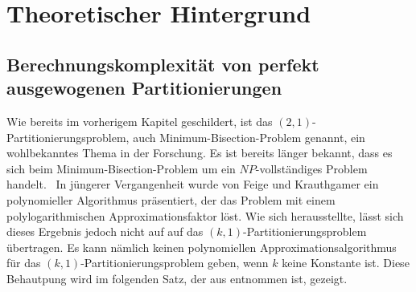 
\newcommand{\apxalg}{\mathcal{A}}
\newcommand{\oset}[2]{%
    \tikz[baseline=(X.base),inner sep=0pt,outer sep=0pt]{%
        \node[inner sep=0pt,outer sep=0pt] (X) {$#2$}; 
            \node[yshift=1pt] at (X.north) {$#1$};
    }
}
\newcommand{\calS}{\mathcal{S}}
\newcommand{\bbS}{\mathbb{S}}
\newcommand{\tildaS}{\oset{\ \scriptstyle\sim}{\calS}}
\newcommand{\calL}{\mathcal{L}}
\newcommand{\calV}{\mathcal{V}}

\chapter{Theoretischer Hintergrund}\label{chapter:theorie}
\section{Berechnungskomplexität von perfekt ausgewogenen Partitionierungen}\label{sec:complex}
Wie bereits im vorherigem Kapitel geschildert, ist das $(2,1)$\hyp Partitionierungsproblem, auch Minimum-Bisection-Problem genannt, ein wohlbekanntes Thema in der Forschung. 
Es ist bereits länger bekannt, dass es sich beim Minimum-Bisection-Problem um ein $NP$\hyp vollständiges Problem handelt.~\parencite{gj79}
In jüngerer Vergangenheit wurde von Feige und Krauthgamer ein polynomieller Algorithmus präsentiert, der das Problem mit einem polylogarithmischen Approximationsfaktor löst. \parencite{fk02}
Wie sich herausstellte, lässt sich dieses Ergebnis jedoch nicht auf auf das $(k,1)$\hyp Partitionierungsproblem übertragen.
Es kann nämlich keinen polynomiellen Approximationsalgorithmus für das $(k,1)$\hyp Partitionierungsproblem geben, wenn $k$ keine Konstante ist.
Diese Behautpung wird im folgenden Satz, der aus \parencite{ar06} entnommen ist, gezeigt. 

